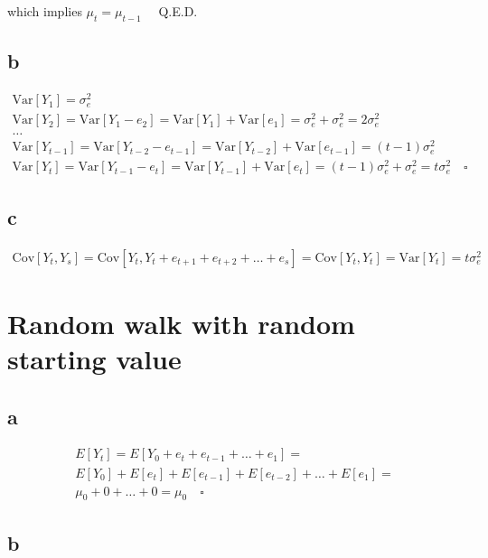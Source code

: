 \documentclass[]{book}
\begin{document}
which implies \(\mu_t = \mu_{t-1}\quad\) Q.E.D.

\subsection*{b}\label{b-14}

\begin{gather*}
  \text{Var}[Y_1] = \sigma_e^2\\
  \text{Var}[Y_2] = \text{Var}[Y_1 - e_2] = \text{Var}[Y_1] + \text{Var}[e_1] = \sigma_e^2 +  \sigma_e^2 = 2\sigma_e^2\\
  \dots\\
  \text{Var}[Y_{t-1}] = \text{Var}[Y_{t-2} - e_{t-1}] = \text{Var}[Y_{t-2}] + \text{Var}[e_{t-1}]  = (t-1)\sigma_e^2\\
  \text{Var}[Y_t] = \text{Var}[Y_{t-1} - e_t] = \text{Var}[Y_{t-1}] + \text{Var}[e_t]  = (t-1)\sigma_e^2 + \sigma_e^2 = t\sigma_e^2 \quad \square
\end{gather*}

\subsection*{c}\label{c-8}

\begin{gather*}
  \text{Cov}[Y_t, Y_s] = \text{Cov}[Y_t, Y_t+e_{t+1}+e_{t+2}+ \dots + e_s] = \text{Cov}[Y_t, Y_t] = \text{Var}[Y_t] = t\sigma_e^2
\end{gather*}

\section{Random walk with random starting
value}\label{random-walk-with-random-starting-value}

\subsection*{a}\label{a-15}

\begin{gather*}
  E[Y_t] = E[Y_0+e_t+e_{t-1}+\dots+e_1] = \\
  E[Y_0] + E[e_t] + E[e_{t-1}] + E[e_{t-2}] + \dots + E[e_1] = \\
  \mu_0 + 0 + \dots + 0 = \mu_0 \quad \square
\end{gather*}

\subsection*{b}\label{b-15}
\end{document}
